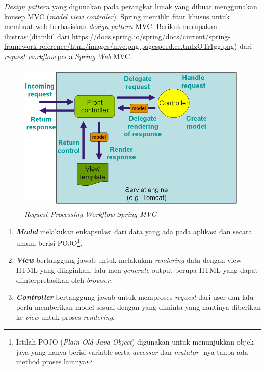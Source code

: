 \textit{Design pattern} yang digunakan pada perangkat lunak yang dibuat menggunakan konsep MVC (\textit{model view controler}). Spring memiliki fitur khusus untuk membuat web berbasiskan \textit{design pattern} MVC. Berikut merupakan ilustrasi(diambil dari \url{https://docs.spring.io/spring/docs/current/spring-framework-reference/html/images/mvc.png.pagespeed.ce.tmIzOTr1gg.png}) dari \textit{request workflow} pada \textit{Spring Web} MVC.
\begin{figure}[h]
	\centering
	\includegraphics[scale=0.5]{GambarIO/mvc_springdocs}
	\caption[Request Processing Workflow Spring MVC]{\textit{Request Processing Workflow Spring MVC}}
	\label{fig:Request Processing Workflow Spring MVC}
\end{figure}

\begin{enumerate}
	\item \textit{\textbf{Model}} melakukan enkapsulasi dari data yang ada pada aplikasi dan secara umum berisi POJO\footnote{Istilah POJO (\textit{Plain Old Java Object}) digunakan untuk menunjukkan objek java yang hanya berisi variable serta \textit{accessor} dan \textit{mutator} -nya tanpa ada method proses lainnya}.
	
	\item \textit{\textbf{View}} bertanggung jawab untuk melakukan \textit{rendering} data dengan view HTML yang diinginkan, lalu men-\textit{generate} output berupa HTML yang dapat diinterpretasikan oleh \textit{browser}.

	\item \textit{\textbf{Controller}} bertanggung jawab untuk memproses \textit{request} dari user dan lalu perlu memberikan model sesuai dengan yang diminta yang nantinya diberikan ke \textit{view} untuk proses \textit{rendering}.
	
\end{enumerate}

